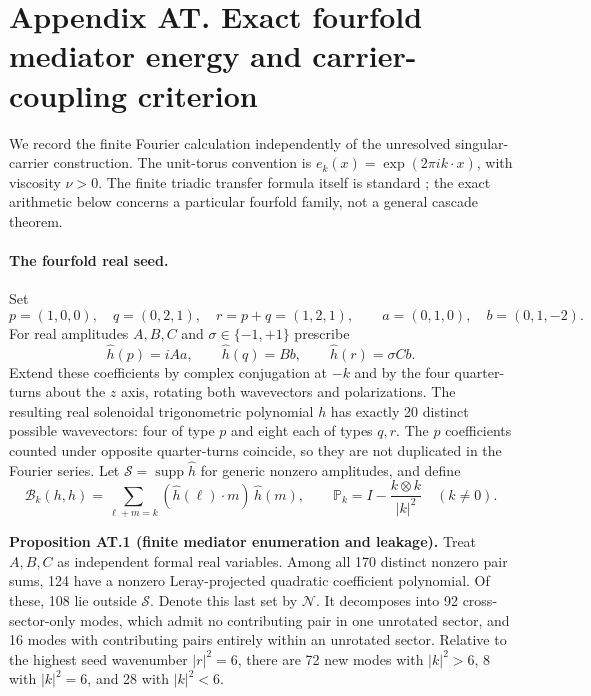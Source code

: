 \clearpage
\section*{Appendix AT. Exact fourfold mediator energy and carrier-coupling criterion}

We record the finite Fourier calculation independently of the unresolved
singular-carrier construction. The unit-torus convention is
$e_k(x)=\exp(2\pi i k\cdot x)$, with viscosity $\nu>0$.
The finite triadic transfer formula itself is standard
\cite{DarVermaEswaran2001}; the exact arithmetic below concerns a
particular fourfold family, not a general cascade theorem.

\paragraph{The fourfold real seed.}
Set
\[
 p=(1,0,0),\quad q=(0,2,1),\quad r=p+q=(1,2,1),
 \qquad a=(0,1,0),\quad b=(0,1,-2).
\]
For real amplitudes $A,B,C$ and $\sigma\in\{-1,+1\}$ prescribe
\[
 \widehat h(p)=iAa,\qquad \widehat h(q)=Bb,\qquad
 \widehat h(r)=\sigma Cb.
\]
Extend these coefficients by complex conjugation at $-k$ and by
the four quarter-turns about the $z$ axis, rotating both wavevectors
and polarizations. The resulting real solenoidal trigonometric
polynomial $h$ has exactly 20 distinct possible wavevectors:
four of type $p$ and eight each of types $q,r$.
The $p$ coefficients counted under opposite quarter-turns coincide,
so they are not duplicated in the Fourier series. Let
$\mathcal S=\operatorname{supp}\widehat h$ for generic nonzero amplitudes,
and define
\[
 \mathcal B_k(h,h)=\sum_{\ell+m=k}
  (\widehat h(\ell)\cdot m)\,\widehat h(m),\qquad
 \mathbb P_k=I-\frac{k\otimes k}{|k|^2}
 \quad(k\ne0).
\]

\noindent\textbf{Proposition AT.1 (finite mediator enumeration and leakage).}
Treat $A,B,C$ as independent formal real variables. Among all 170
distinct nonzero pair sums, 124 have a nonzero Leray-projected
quadratic coefficient polynomial. Of these, 108 lie outside $\mathcal S$.
Denote this last set by $\mathcal N$. It decomposes into 92
cross-sector-only modes, which admit no contributing pair in one
unrotated sector, and 16 modes with contributing pairs entirely within
an unrotated sector. Relative to the highest seed wavenumber
$|r|^2=6$, there are 72 new modes with $|k|^2>6$, 8 with
$|k|^2=6$, and 28 with $|k|^2<6$.


